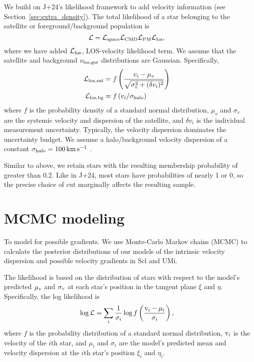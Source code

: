 We build on J+24's likelihood framework to add velocity information (see
Section~\ref{sec:extra_density}). The total likelihood of a star
belonging to the satellite or foreground/background population is
\begin{equation}{
{\cal L} = {\cal L}_{\rm space} {\cal L}_{\rm CMD} {\cal L}_{\rm PM} {\cal L}_{\rm los},
}\end{equation} where we have added \({\cal L}_{\rm los}\), LOS-velocity
likelihood term. We assume that the satellite and background
\(v_{\rm los, gsr}\) distributions are Gaussian. Specifically,
\begin{equation}{
\begin{split}
{\cal L}_{\rm los, sat} &= f\left( \frac{v_i -\mu_{v}}{\sqrt{\sigma_{v}^2 + (\delta v_i)^2}}\right) \\
{\cal L}_{\rm los, bg} &= f\left( v_i /  \sigma_{\rm halo} \right)
\end{split}
}\end{equation} where \(f\) is the probability density of a standard
normal distribution, \(\mu_v\) and \(\sigma_v\) are the systemic
velocity and dispersion of the satellite, and \(\delta v_i\) is the
individual measurement uncertainty. Typically, the velocity dispersion
dominates the uncertainty budget. We assume a halo/background velocity
dispersion of a constant \(\sigma_{\rm halo} = 100\,{\rm km\,s^{-1}}\)
\citep[e.g.][]{brown+2010}.

Similar to above, we retain stars with the resulting membership
probability of greater than 0.2. Like in J+24, most stars have
probabilities of nearly 1 or 0, so the precise choice of cut marginally
affects the resulting sample.

\section{MCMC modeling}\label{mcmc-modeling}

To model for possible gradients. We use Monte-Carlo Markov chains (MCMC)
to calculate the posterior distributions of our models of the intrinsic
velocity dispersion and possible velocity gradients in Scl and UMi.

The likelihood is based on the distribution of stars with respect to the
model's predicted \(\mu_{\rm v}\) and \(\sigma_{\rm v}\) at each star's position
in the tangent plane \(\xi\) and \(\eta\). Specifically, the log
likelihood is \begin{equation}{
\log {\cal L} = \sum_i \frac{1}{\sigma_i} \log f\left(\frac{{\rm v}_i - \mu_i}{\sigma_i}\right),
}\end{equation} where \(f\) is the probability distribution of a
standard normal distribution, \({\rm v}_i\) is the velocity of the \(i\)th
star, and \(\mu_i\) and \(\sigma_i\) are the model's predicted mean and
velocity dispersion at the \(i\)th star's position \(\xi_i\) and
\(\eta_i\).

